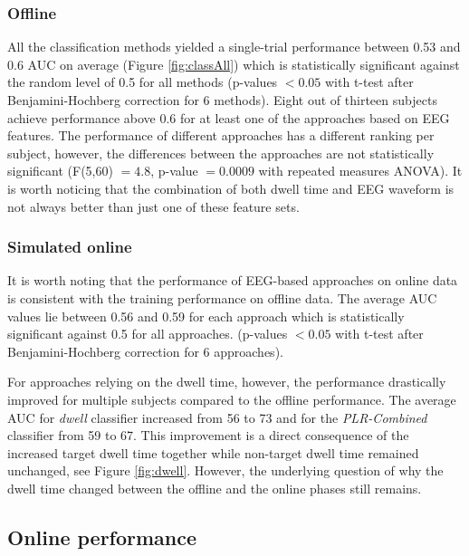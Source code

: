 \documentclass[12pt]{iopart}
\begin{document}
\subsubsection*{Offline}
All the classification methods yielded a single-trial 
performance between 0.53 and 0.6 AUC on average
(Figure \ref{fig:classAll})
which is statistically significant against the random level of 0.5 
for all methods
(p-values $< 0.05$ with t-test after Benjamini-Hochberg correction
for 6 methods).
Eight out of thirteen subjects achieve performance 
above 0.6 for at least one of the approaches based
on EEG features.
The performance of different approaches has a different ranking per subject, however,
the differences between
the approaches are not statistically significant (F(5,60) $=4.8$, p-value $= 0.0009$ with repeated measures ANOVA).
It is worth noticing that the combination of both dwell time and EEG waveform is not always
better than just one of these feature sets.

\subsubsection*{Simulated online}
It is worth noting that the performance of EEG-based approaches
on online data is consistent with the training performance on offline data.
The average AUC values lie between 0.56 and 0.59 for each approach
which is statistically significant against 0.5
for all approaches.
(p-values $< 0.05$ with t-test after Benjamini-Hochberg correction 
for 6 approaches).

For approaches relying on the dwell time, however, the performance drastically improved
for multiple subjects compared to the offline performance.
The average AUC for \textit{dwell} classifier increased
from 56 to 73 and for the \textit{PLR-Combined} classifier from 59 to 67.
This improvement is a direct consequence of the increased target dwell time
together while non-target dwell time remained unchanged, see Figure \ref{fig:dwell}.
However, the underlying question of why the dwell time changed 
between the offline and the online phases still remains.


\subsection{Online performance}
\end{document}
